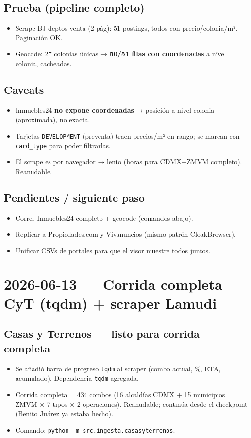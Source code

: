 \documentclass[11pt]{article}
\newcommand{\codigo}[1]{\texttt{#1}}
\newcommand{\pend}{\item[\textcolor{acento}{$\square$}]}
\begin{document}
\subsection*{Prueba (pipeline completo)}
\begin{itemize}
  \item Scrape BJ deptos venta (2 pág): 51 postings, todos con precio/colonia/m².
        Paginación OK.
  \item Geocode: 27 colonias únicas → \textbf{50/51 filas con coordenadas} a nivel
        colonia, cacheadas.
\end{itemize}

\subsection*{Caveats}
\begin{itemize}
  \item Inmuebles24 \textbf{no expone coordenadas} → posición a nivel colonia
        (aproximada), no exacta.
  \item Tarjetas \codigo{DEVELOPMENT} (preventa) traen precios/m² en rango; se
        marcan con \codigo{card\_type} para poder filtrarlas.
  \item El scrape es por navegador → lento (horas para CDMX+ZMVM completo). Reanudable.
\end{itemize}

\subsection*{Pendientes / siguiente paso}
\begin{itemize}
  \pend Correr Inmuebles24 completo + geocode (comandos abajo).
  \pend Replicar a Propiedades.com y Vivanuncios (mismo patrón CloakBrowser).
  \pend Unificar CSVs de portales para que el visor muestre todos juntos.
\end{itemize}

\section*{2026-06-13 — Corrida completa CyT (tqdm) + scraper Lamudi}

\subsection*{Casas y Terrenos — listo para corrida completa}
\begin{itemize}
  \item Se añadió barra de progreso \codigo{tqdm} al scraper (combo actual, \%, ETA,
        acumulado). Dependencia \codigo{tqdm} agregada.
  \item Corrida completa = 434 combos (16 alcaldías CDMX + 15 municipios ZMVM
        $\times$ 7 tipos $\times$ 2 operaciones). Reanudable; continúa desde el
        checkpoint (Benito Juárez ya estaba hecho).
  \item Comando: \codigo{python -m src.ingesta.casasyterrenos}.
\end{itemize}
\end{document}
